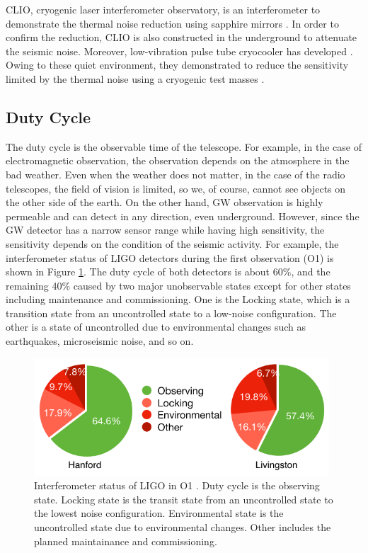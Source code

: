 CLIO, cryogenic laser interferometer observatory, is an interferometer to demonstrate the thermal noise reduction using sapphire mirrors \cite{ohashi2003design}. In order to confirm the reduction, CLIO is also constructed in the underground to attenuate the seismic noise. Moreover, low-vibration pulse tube cryocooler has developed \cite{tomaru2004development}. Owing to these quiet environment, they demonstrated to reduce the sensitivity limited by the thermal noise using a cryogenic test masses \cite{uchiyama2012reduction}.


\subsection{Duty Cycle} \label{sec:duty}
The duty cycle is the observable time of the telescope. For example, in the case of electromagnetic observation, the observation depends on the atmosphere in the bad weather. Even when the weather does not matter, in the case of the radio telescopes, the field of vision is limited, so we, of course, cannot see objects on the other side of the earth. On the other hand, GW observation is highly permeable and can detect in any direction, even underground. However, since the GW detector has a narrow sensor range while having high sensitivity, the sensitivity depends on the condition of the seismic activity. For example, the interferometer status of LIGO detectors during the first observation (O1) is shown in Figure \ref{img:img190}. The duty cycle of both detectors is about 60\%, and the remaining 40\% caused by two major unobservable states except for other states including maintenance and commissioning. One is the Locking state, which is a transition state from an uncontrolled state to a low-noise configuration. The other is a state of uncontrolled due to environmental changes such as earthquakes, microseismic noise, and so on.

\begin{figure}[h]
  \begin{center}
    \includegraphics[width=11.0cm]{./img_chap1/img190.png}
    \caption{Interferometer status of LIGO in O1 \cite{abbott2018prospects}. Duty cycle is the observing state. Locking state is the transit state from an uncontrolled state to the lowest noise configuration. Environmental state is the uncontrolled state due to environmental changes. Other includes the planned maintainance and commissioning.}\label{img:img190}
  \end{center}
\end{figure}


